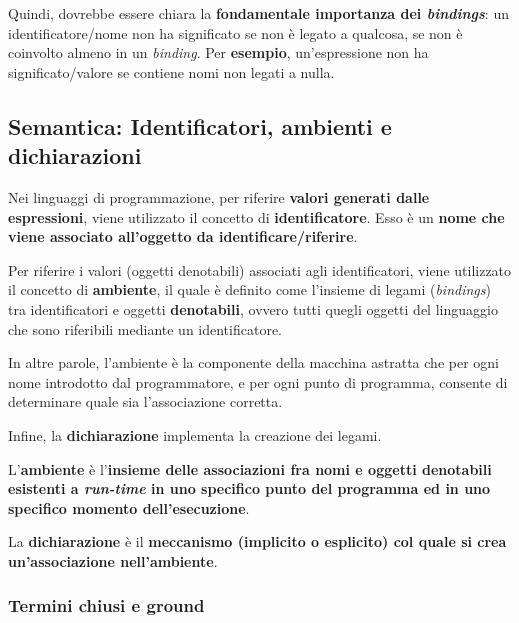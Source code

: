 \documentclass[a4paper]{article}
\begin{document}
	Quindi, dovrebbe essere chiara la \textbf{fondamentale importanza dei \emph{bindings}}: un identificatore/nome non ha significato se non è legato a qualcosa, se non è coinvolto almeno in un \emph{binding}. Per \textcolor{Green4}{\textbf{esempio}}, un'espressione non ha significato/valore se contiene nomi non legati a nulla.\newpage
	
	
	\subsection{Semantica: Identificatori, ambienti e dichiarazioni}
	
	Nei linguaggi di programmazione, per riferire \textbf{valori generati dalle espressioni}, viene utilizzato il concetto di \textcolor{Red3}{\textbf{identificatore}}. Esso è un \textbf{nome che viene associato all'oggetto da identificare/riferire}.\newline
	
	\noindent
	Per riferire i valori (oggetti denotabili) associati agli identificatori, viene utilizzato il concetto di \textcolor{Red3}{\textbf{ambiente}}, il quale è definito come l'insieme di legami (\emph{bindings}) tra identificatori e oggetti \textbf{denotabili}, ovvero tutti quegli oggetti del linguaggio che sono riferibili mediante un identificatore.
	
	In altre parole, l'ambiente è la componente della macchina astratta che per ogni nome introdotto dal programmatore, e per ogni punto di programma, consente di determinare quale sia l'associazione corretta.\newline
	
	\noindent
	Infine, la \textbf{dichiarazione} implementa la creazione dei legami.\newline
	
	\noindent
	\begin{boxdef}
		L'\textcolor{Red3}{\textbf{ambiente}} è l'\textbf{insieme delle associazioni fra nomi e oggetti denotabili esistenti a \emph{run-time} in uno specifico punto del programma ed in uno specifico momento dell'esecuzione}.
	\end{boxdef}
	\begin{boxdef}
		La \textcolor{Red3}{\textbf{dichiarazione}} è il \textbf{meccanismo (implicito o esplicito) col quale si crea un'associazione nell'ambiente}.
	\end{boxdef}\newpage

	
	\subsubsection{Termini chiusi e ground}
	
\end{document}
